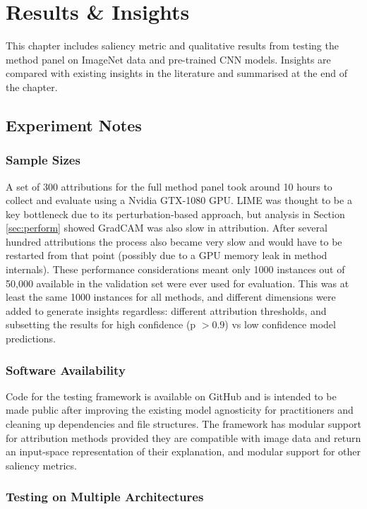 \documentclass[main]{subfiles}
\begin{document}
\chapter{Results \& Insights}


This chapter includes saliency metric and qualitative results from testing the method panel on ImageNet data and pre-trained CNN models. Insights are compared with existing insights in the literature and summarised at the end of the chapter.

\section{Experiment Notes}

\subsection{Sample Sizes}  \label{sec:data_collection}
A set of 300 attributions for the full method panel took around 10 hours to collect and evaluate using a Nvidia GTX-1080 GPU. LIME was thought to be a key bottleneck due to its perturbation-based approach, but analysis in Section \ref{sec:perform} showed GradCAM was also slow in attribution. After several hundred attributions the process also became very slow and would have to be restarted from that point (possibly due to a GPU memory leak in method internals). These performance considerations meant only 1000 instances out of 50,000 available in the validation set were ever used for evaluation. This was at least the same 1000 instances for all methods, and different dimensions were added to generate insights regardless: different attribution thresholds, and subsetting the results for high confidence (p $>0.9$) vs low confidence model predictions.

\subsection{Software Availability}

Code for the testing framework is available on GitHub and is intended to be made public after improving the existing model agnosticity for practitioners and cleaning up dependencies and file structures. The framework has modular support for attribution methods provided they are compatible with image data and return an input-space representation of their explanation, and modular support for other saliency metrics.


\subsection{Testing on Multiple Architectures} \label{sec:shap_note}
\end{document}
